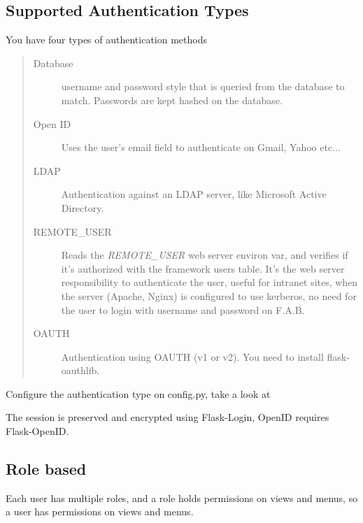 \documentclass[letterpaper,10pt,english]{sphinxmanual}
\begin{document}
\subsection{Supported Authentication Types}
\label{security:supported-authentication-types}
You have four types of authentication methods
\begin{quote}\begin{description}
\item[{Database}] \leavevmode
username and password style that is queried from the database to match. Passwords are kept hashed on the database.

\item[{Open ID}] \leavevmode
Uses the user's email field to authenticate on Gmail, Yahoo etc...

\item[{LDAP}] \leavevmode
Authentication against an LDAP server, like Microsoft Active Directory.

\item[{REMOTE\_USER}] \leavevmode
Reads the \emph{REMOTE\_USER} web server environ var, and verifies if it's authorized with the framework users table.
It's the web server responsibility to authenticate the user, useful for intranet sites, when the server (Apache, Nginx)
is configured to use kerberos, no need for the user to login with username and password on F.A.B.

\item[{OAUTH}] \leavevmode
Authentication using OAUTH (v1 or v2). You need to install flask-oauthlib.

\end{description}\end{quote}

Configure the authentication type on config.py, take a look at {\hyperref[config::doc]{}}

The session is preserved and encrypted using Flask-Login, OpenID requires Flask-OpenID.


\subsection{Role based}
\label{security:role-based}
Each user has multiple roles, and a role holds permissions on views and menus, so a user has permissions on views and menus.
\end{document}
